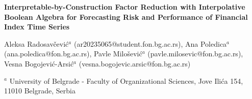 \documentclass[review]{elsarticle}
\begin{document}
\begin{frontmatter}

\begin{titlepage}
\begin{center}
\vspace*{1cm}

\textbf{\large Interpretable-by-Construction Factor Reduction with Interpolative Boolean Algebra for Forecasting Risk and Performance of Financial Index Time Series}

\vspace{1.5cm}

Aleksa Radosav\v{c}evi\'c$^a$ (ar20235065@student.fon.bg.ac.rs), Ana Poledica$^a$ (ana.poledica@fon.bg.ac.rs), Pavle Milo\v{s}evi\'c$^a$ (pavle.milosevic@fon.bg.ac.rs), Vesna Bogojevi\'c-Arsi\'c$^a$ (vesna.bogojevic.arsic@fon.bg.ac.rs)\\

\hspace{10pt}

\begin{flushleft}
$^a$ University of Belgrade - Faculty of Organizational Sciences, Jove Ili\'ca 154, 11010 Belgrade, Serbia\\
\end{flushleft}

\vfill

\end{center}
\end{titlepage}

\author[label1]{Aleksa Radosav\v{c}evi\'c}

\author[label1]{Ana Poledica}

\author[label1]{Pavle Milo\v{s}evi\'c}

\author[label1]{Vesna Bogojevi\'c-Arsi\'c}

\address[label1]{University of Belgrade - Faculty of Organizational Sciences, Jove Ili\'ca 154,
11010 Belgrade, Serbia}


\end{frontmatter}
\end{document}
